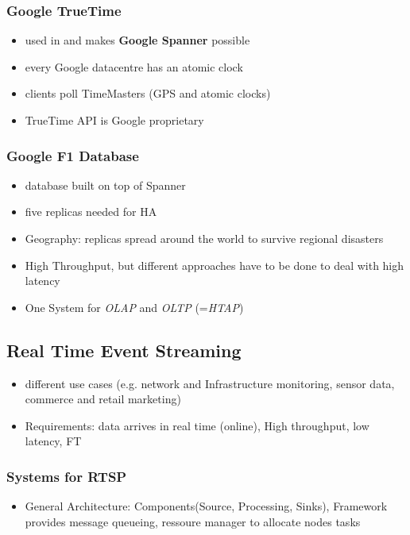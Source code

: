 \documentclass[a4paper]{article}
\begin{document}
\begin{multicols}{3}
\subsubsection{Google TrueTime}
\begin{itemize}
    \item used in and makes \textbf{Google Spanner} possible
    \item every Google datacentre has an atomic clock
    \item clients poll TimeMasters (GPS and atomic clocks)
    \item TrueTime API is Google proprietary
\end{itemize}

\subsubsection{Google F1 Database}
\begin{itemize}
    \item database built on top of Spanner
    \item five replicas needed for HA
    \item Geography: replicas spread around the world to survive regional disasters
    \item High Throughput, but different approaches have to be done to deal with high latency
    \item One System for \textit{OLAP} and \textit{OLTP} (=\textit{HTAP})
\end{itemize}

\subsection{Real Time Event Streaming}
\begin{itemize}
    \item different use cases (e.g. network and Infrastructure monitoring, sensor data, commerce and retail marketing)
    \item Requirements: data arrives in real time (online), High throughput, low latency, FT
\end{itemize}

\subsubsection{Systems for RTSP}
\begin{itemize}
    \item General Architecture: Components(Source, Processing, Sinks), Framework provides message queueing, ressoure manager to allocate nodes tasks
\end{itemize}


\end{multicols}
\end{document}
